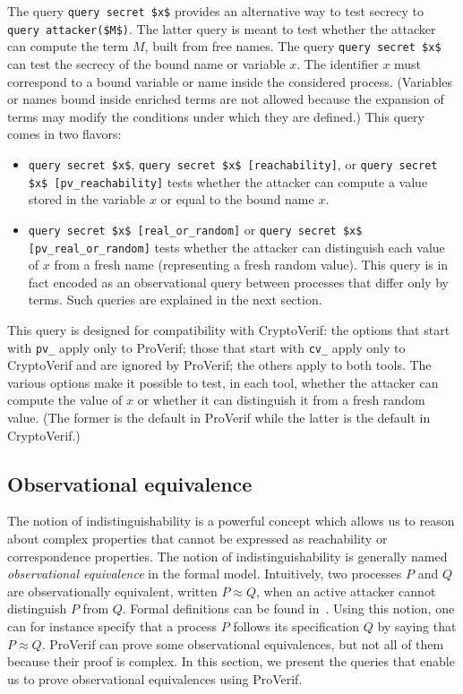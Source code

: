 \documentclass{book}
\begin{document}
The query \lstinline!query secret $x$! provides an alternative way to test secrecy
to \lstinline!query attacker($M$)!. The latter query is meant to test whether the attacker can compute the term $M$, built from free names. The query \lstinline!query secret $x$! can test the secrecy of the bound name or variable $x$.
The identifier $x$ must correspond to a bound variable or name inside the considered process. (Variables or names bound inside enriched terms are not allowed because the expansion of terms may modify the conditions under which they are defined.)
This query comes in two flavors:
\begin{itemize}

\item \lstinline!query secret $x$!, \lstinline!query secret $x$ [reachability]!, or \lstinline!query secret $x$ [pv_reachability]! tests whether the attacker can compute a value stored in the variable $x$ or equal to the bound name $x$.

\item \lstinline!query secret $x$ [real_or_random]! or  \lstinline!query secret $x$ [pv_real_or_random]! tests whether the attacker can distinguish each value of $x$ from a fresh name (representing a fresh random value). This query is in fact encoded as an observational query between processes that differ only by terms. Such queries are explained in the next section.

\end{itemize}
This query is designed for compatibility with CryptoVerif: the options that start with \lstinline!pv_! apply only to ProVerif; those that start with \lstinline!cv_! apply only to CryptoVerif and are ignored by ProVerif; the others apply to both tools. The various options make it possible to test, in each tool, whether the attacker can compute the value of $x$ or whether it can distinguish it from a fresh random value. (The former is the default in ProVerif while the latter is the default in CryptoVerif.)

\subsection{Observational equivalence}\label{sec:obsequi}

The notion of indistinguishability is a powerful concept which allows
us to reason about complex properties that cannot be expressed as
reachability or correspondence properties. The notion of
indistinguishability is generally named \emph{observational
  equivalence} in the formal model. Intuitively, two processes $P$ and
$Q$ are observationally equivalent, written $P \approx Q$, when an
active attacker cannot distinguish $P$ from $Q$. Formal definitions can
be found in~\cite{Abadi2001,Blanchet07b}. Using this notion, one can
for instance specify that a process $P$ follows its specification $Q$ by
saying that $P \approx Q$. ProVerif can prove some observational
equivalences, but not all of them because their proof is complex.
In this section, we present the queries that enable us to
prove observational equivalences using ProVerif.
\end{document}
